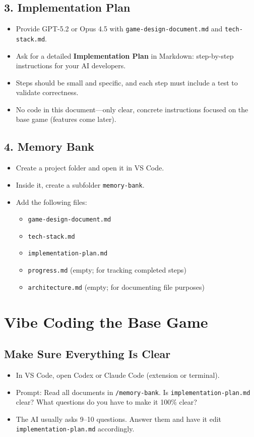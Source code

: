 \documentclass[12pt]{article}
\begin{document}
\subsection{3. Implementation Plan}
\begin{itemize}
  \item Provide GPT-5.2 or Opus 4.5 with \texttt{game-design-document.md} and \texttt{tech-stack.md}.
  \item Ask for a detailed \textbf{Implementation Plan} in Markdown: step-by-step instructions for your AI developers.
  \item Steps should be small and specific, and each step must include a test to validate correctness.
  \item No code in this document—only clear, concrete instructions focused on the base game (features come later).
\end{itemize}

\subsection{4. Memory Bank}
\begin{itemize}
  \item Create a project folder and open it in VS Code.
  \item Inside it, create a subfolder \texttt{memory-bank}.
  \item Add the following files:
  \begin{itemize}
    \item \texttt{game-design-document.md}
    \item \texttt{tech-stack.md}
    \item \texttt{implementation-plan.md}
    \item \texttt{progress.md} (empty; for tracking completed steps)
    \item \texttt{architecture.md} (empty; for documenting file purposes)
  \end{itemize}
\end{itemize}

\section{Vibe Coding the Base Game}
\subsection{Make Sure Everything Is Clear}
\begin{itemize}
  \item In VS Code, open Codex or Claude Code (extension or terminal).
  \item Prompt: Read all documents in \texttt{/memory-bank}. Is \texttt{implementation-plan.md} clear? What questions do you have to make it 100\% clear?
  \item The AI usually asks 9--10 questions. Answer them and have it edit \texttt{implementation-plan.md} accordingly.
\end{itemize}
\end{document}
